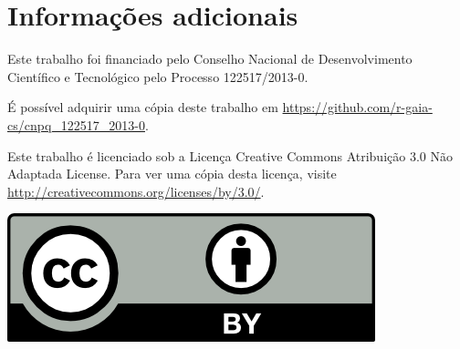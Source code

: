 \section{Informa\c{c}\~{o}es adicionais}
Este trabalho foi financiado pelo Conselho Nacional de Desenvolvimento
Cient\'{i}fico e Tecnol\'{o}gico pelo Processo 122517/2013-0.

É possível adquirir uma cópia deste trabalho em \url{https://github.com/r-gaia-cs/cnpq_122517_2013-0}.

Este trabalho \'{e} licenciado sob a Licen\c{c}a Creative Commons
Atribui\c{c}\~{a}o 3.0 N\~{a}o Adaptada License. Para ver uma c\'{o}pia desta
licen\c{c}a, visite \url{http://creativecommons.org/licenses/by/3.0/}.
\begin{center}
    \includegraphics{figuras/cc-by.png}
\end{center}
